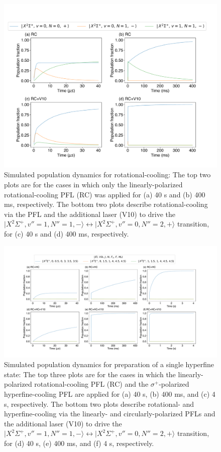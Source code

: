 \documentclass[nofootinbib,aip,jcp,reprint]{revtex4-1}
\begin{document}
\begin{figure}[htbp!]
  \centering
  \includegraphics[width=12cm]{RC_RCV10}
  \caption
  {Simulated population dynamics for rotational-cooling: The top two plots are for the cases in which only the linearly-polarized rotational-cooling PFL (RC) was applied for (a) 40 {\micro}s and (b) 400 ms, respectively. The bottom two plots describe rotational-cooling via the PFL and the additional laser (V10) to drive the $\lvert X^2\Sigma^+, v''=1, N''=1, -\rangle \leftrightarrow \lvert X^2\Sigma^+, v''=0, N''=2, +\rangle$ transition, for (c) 40 {\micro}s and (d) 400 ms, respectively.
  }\label{RC_RCV10}
\end{figure}

\begin{figure}[htbp!]
  \centering
  \includegraphics[width=18cm]{RCHC_RCHCV10}
  \caption
  {Simulated population dynamics for preparation of a single hyperfine state: The top three plots are for the cases in which the linearly-polarized rotational-cooling PFL (RC) and the $\sigma^+$-polarized hyperfine-cooling PFL are applied for (a) 40 {\micro}s, (b) 400 ms, and (c) 4 s, respectively. The bottom two plots describe rotational- and hyperfine-cooling via the linearly- and circularly-polarized PFLs and the additional laser (V10) to drive the $\lvert X^2\Sigma^+, v''=1, N''=1, -\rangle \leftrightarrow \lvert X^2\Sigma^+, v''=0, N''=2, +\rangle$ transition, for (d) 40 {\micro}s, (e) 400 ms, and (f) 4 s, respectively.
}\label{RCHC_RCHCV10}
\end{figure}
\end{document}
